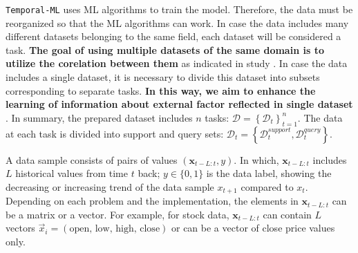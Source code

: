 
\verb|Temporal-ML| uses ML algorithms to train the model. Therefore, the data must be reorganized so that the ML algorithms can work. In case the data includes many different datasets belonging to the same field, each dataset will be considered a task. \textbf{The goal of using multiple datasets of the same domain is to utilize the corelation between them} as indicated in study \cite{overreactioncontrarian, mech1993portfolio}. In case the data includes a single dataset, it is necessary to divide this dataset into subsets corresponding to separate tasks. \textbf{In this way, we aim to enhance the learning of information about external factor reflected in single dataset} \cite{fama1970efficient}. In summary, the prepared dataset includes $n$ tasks: $\mathcal{D} = \left\{ \mathcal{D}_t \right\}_{t=1}^{n}$. The data at each task is divided into support and query sets: $\mathcal{D}_t = \left\{ \mathcal{D}_t^{support}, \mathcal{D}_t^{query} \right\}$.


A data sample consists of pairs of values $(\mathbf{x}_{t-L:t}, y)$. In which, $\mathbf{x}_{t-L:t}$ includes $L$ historical values from time $t$ back; $y\in \{0,1\}$ is the data label, showing the decreasing or increasing trend of the data sample $x_{t+1}$ compared to $x_{t}$. Depending on each problem and the implementation, the elements in $\mathbf{x}_{t-L:t}$ can be a matrix or a vector. For example, for stock data, $\mathbf{x}_{t-L:t}$ can contain $L$ vectors $\vec x_i = (\text{open, low, high, close})$ or can be a vector of close price values only.

